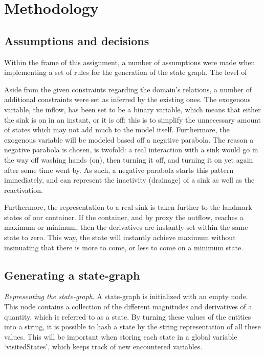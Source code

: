 \section{Methodology}

\subsection{Assumptions and decisions}
Within the frame of this assignment, a number of assumptions were made when
implementing a set of rules for the generation of the state graph. The level of

Aside from the given constraints regarding the domain's relations, a number of
additional constraints were set as inferred by the existing ones. The exogenous
variable, the inflow, has been set to be a binary variable, which means that
either the sink is on in an instant, or it is off: this is to simplify the
unnecessary amount of states which may not add much to the model itself.
Furthermore, the exogenous variable will be modeled based off a negative
parabola. The reason a negative parabola is chosen, is twofold: a real
interaction with a sink would go in the way off washing hands (on), then turning
it off, and turning it on yet again after some time went by. As such, a negative
parabola starts this pattern immediately, and can represent the inactivity (drainage)
of a sink as well as the reactivation.

Furthermore, the representation to a real sink is taken further to the landmark
states of our container. If the container, and by proxy the outflow, reaches a
maximum or minimum, then the derivatives are instantly set within the same state
to zero. This way, the state will instantly achieve maximum without insinuating
that there is more to come, or less to come on a minimum state.

\subsection{Generating a state-graph}
\textit{Representing the state-graph}. A state-graph is initialized with an
empty node. This node contains a collection of the different magnitudes and
derivatives of a quantity, which is referred to as a state. By turning these
values of the entities into a string, it is possible to hash a state by the
string representation of all these values. This will be important when storing
each state in a global variable `visitedStates', which keeps track of new
encountered variables. 


